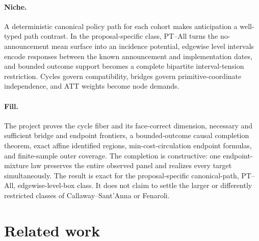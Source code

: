 \documentclass{article}
\begin{document}
\paragraph{Niche.} A deterministic canonical policy path for each cohort makes anticipation a well-typed path contrast. In the proposal-specific class, PT--All turns the no-announcement mean surface into an incidence potential, edgewise level intervals encode responses between the known announcement and implementation dates, and bounded outcome support becomes a complete bipartite interval-tension restriction. Cycles govern compatibility, bridges govern primitive-coordinate independence, and ATT weights become node demands.

\paragraph{Fill.} The project proves the cycle fiber and its face-correct dimension, necessary and sufficient bridge and endpoint frontiers, a bounded-outcome causal completion theorem, exact affine identified regions, min-cost-circulation endpoint formulas, and finite-sample outer coverage. The completion is constructive: one endpoint-mixture law preserves the entire observed panel and realizes every target simultaneously. The result is exact for the proposal-specific canonical-path, PT--All, edgewise-level-box class. It does not claim to settle the larger or differently restricted classes of Callaway--Sant'Anna or Fenaroli.

\section{Related work}
\end{document}
